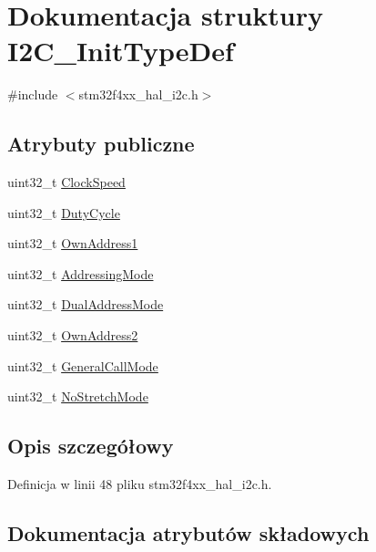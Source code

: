 \hypertarget{struct_i2_c___init_type_def}{}\section{Dokumentacja struktury I2\+C\+\_\+\+Init\+Type\+Def}
\label{struct_i2_c___init_type_def}


{\ttfamily \#include $<$stm32f4xx\+\_\+hal\+\_\+i2c.\+h$>$}

\subsection*{Atrybuty publiczne}
\begin{DoxyCompactItemize}
\item 
uint32\+\_\+t \hyperlink{struct_i2_c___init_type_def_a45f1209e7e43e55f055bd9ead064230a}{Clock\+Speed}
\item 
uint32\+\_\+t \hyperlink{struct_i2_c___init_type_def_a91eb2f998ac771478ec0f44ac73c32dd}{Duty\+Cycle}
\item 
uint32\+\_\+t \hyperlink{struct_i2_c___init_type_def_abfb610317ea08e85c8feece82ccc9e16}{Own\+Address1}
\item 
uint32\+\_\+t \hyperlink{struct_i2_c___init_type_def_a5c39c41a5ee892c1bce69a579cc017ca}{Addressing\+Mode}
\item 
uint32\+\_\+t \hyperlink{struct_i2_c___init_type_def_add6a6b87ee067d33c94c554288736d40}{Dual\+Address\+Mode}
\item 
uint32\+\_\+t \hyperlink{struct_i2_c___init_type_def_a8165caf61b7b52f903edd7517ddaa06b}{Own\+Address2}
\item 
uint32\+\_\+t \hyperlink{struct_i2_c___init_type_def_a17ce92b135a4b5c045a5387c91677803}{General\+Call\+Mode}
\item 
uint32\+\_\+t \hyperlink{struct_i2_c___init_type_def_a28afdce458703464638f1a01e04da04e}{No\+Stretch\+Mode}
\end{DoxyCompactItemize}


\subsection{Opis szczegółowy}


Definicja w linii 48 pliku stm32f4xx\+\_\+hal\+\_\+i2c.\+h.



\subsection{Dokumentacja atrybutów składowych}
\mbox{\label{struct_i2_c___init_type_def_a5c39c41a5ee892c1bce69a579cc017ca}} 
